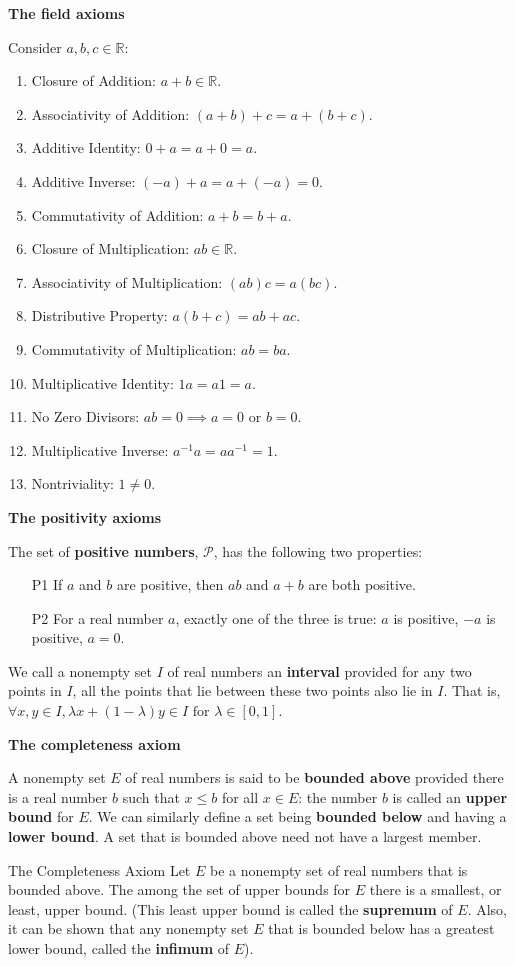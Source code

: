 \documentclass[a4paper,10pt]{book}
\theoremstyle{plain} %
\newcommand{\thistheoremname}{}
\newtheorem*{genericthm*}{\thistheoremname}
\newenvironment{namedthm*}[1]
	{\renewcommand{\thistheoremname}{#1}%
	\begin{genericthm*}}
	{\end{genericthm*}}
\begin{document}
\begin{flushleft}

\textbf{The field axioms}\par
Consider $a,b,c \in \mathbb{R}$:
\begin{enumerate}
	\item Closure of Addition: $a+b \in \mathbb{R}$.
	\item Associativity of Addition: $(a+b)+c = a+(b+c)$.
	\item Additive Identity: $0+a=a+0=a$.
	\item Additive Inverse: $(-a)+a=a+(-a)=0$.
	\item Commutativity of Addition: $a+b=b+a$.
	\item Closure of Multiplication: $ab \in \mathbb{R}$.
	\item Associativity of Multiplication: $(ab)c = a(bc)$.
	\item Distributive Property: $ a(b+c)=ab+ac$.
	\item Commutativity of Multiplication: $ab=ba$.
	\item Multiplicative Identity: $1a=a1=a$.
	\item No Zero Divisors: $ab=0 \implies a=0 \text{ or } b=0$.
	\item Multiplicative Inverse: $a^{-1}a=aa^{-1}=1$.
	\item Nontriviality: $1 \neq 0$.
\end{enumerate}
\medskip

\textbf{The positivity axioms}\par
The set of \textbf{positive numbers}, $\mathcal{P}$, has the following two properties:
\begin{itemize}
    \item [P1] If $a$ and $b$ are positive, then $ab$ and $a+b$ are both positive.
    \item [P2] For a real number $a$, exactly one of the three is true: $a$ is positive, $-a$ is positive, $a=0$.	
\end{itemize}

We call a nonempty set $I$ of real numbers an \textbf{interval} provided for any two points in $I$, all the points that lie between these two points also lie in $I$.
That is, $\forall x,y \in I, \lambda x + (1-\lambda)y \in I \text{ for } \lambda \in [0,1]$.
\medskip

\textbf{The completeness axiom}\par
A nonempty set $E$ of real numbers is said to be \textbf{bounded above} provided there is a real number $b$ such that $x \le b$ for all $x\in E$: the number $b$ is called an \textbf{upper bound} for $E$.
We can similarly define a set being \textbf{bounded below} and having a \textbf{lower bound}. A set that is bounded above need not have a largest member.
\begin{namedthm*}{The Completeness Axiom}
Let $E$ be a nonempty set of real numbers that is bounded above. The among the set of upper bounds for $E$ there is a smallest, or least, upper bound.
(This least upper bound is called the \textbf{supremum} of $E$. Also, it can be shown that any nonempty set $E$ that is bounded below has a greatest lower bound, called the \textbf{infimum} of $E$).	
\end{namedthm*}


\end{flushleft}
\end{document}
